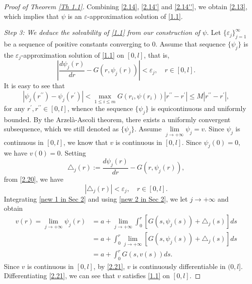 \documentclass[a4paper,11pt]{amsart}
\theoremstyle{plain}
\theoremstyle{remark}
\numberwithin{equation}{section}
\numberwithin{figure}{section}
\numberwithin{remark}{section}
\begin{document}
\begin{sloppypar}
\begin{proof}[Proof of Theorem \ref{Th 1.1}]
\vspace{2mm}
	
	Combining \eqref{2.14}, \eqref{2.14'} and \eqref{2.14''}, we obtain \eqref{2.13}, which implies that $\psi$ is an $\varepsilon$-approximation solution of \eqref{1.1}.
		
	\vspace{2mm}	
	\textit{Step 3: We deduce the solvability of \eqref{1.1} from our construction of $\psi$}.
	Let $\{\varepsilon_j\}_{j=1}^{\infty}$ be a sequence of positive constants converging to $0$. Assume that sequence $\{\psi_j\}$ is the $\varepsilon_j$-approximation solution of \eqref{1.1} on $[0,l]$, that is,
	\begin{equation}\label{2.20}
		\left| \frac{d\psi_j(r)}{dr}-G(r,\psi_j(r))\right| <\varepsilon_j, \quad r\in [0,l].
	\end{equation} 	
	It is easy to see that
	\begin{equation*}
		\left| \psi_j(r^{\prime \prime })-\psi_j(r^{\prime})\right| <\max_{1\leq i \leq m}G(r_i,\psi(r_i))|r^{\prime\prime}-r^{\prime}|\leq M|r^{\prime\prime}-r^{\prime}|,
	\end{equation*}
	for any $r^{\prime}, r^{\prime \prime } \in [0,l]$, whence
	 the sequence $\{\psi_j\}$ is equicontinuous and uniformly bounded.
	By the Arzel\` a-Ascoli theorem, there exists a uniformly convergent subsequence, which we still  denoted as $\{\psi_j\}$.
	Assume $\lim\limits_{j\to +\infty}\psi_j=v$. 
	Since $\psi_j$ is continuous in $[0, l]$, we know that $v$ is continuous in $[0, l]$.
	Since $\psi_j(0)=0$, we have $v(0)=0$. Setting
	\begin{equation}\label{new 1 in Sec 2}
		\triangle_j(r):=\frac{d\psi_j(r)}{dr}-G(r,\psi_j(r)),
	\end{equation}
	from \eqref{2.20}, we have
	\begin{equation}\label{new 2 in Sec 2}
	|\triangle_j(r)|<\varepsilon_j, \quad   r\in[0,l].
	\end{equation}
	Integrating \eqref{new 1 in Sec 2} and using \eqref{new 2 in Sec 2}, we let $j\to +\infty$ and obtain
	\begin{equation}\label{2.21}
		\begin{split}
			v(r)=\lim_{j\to +\infty}\psi_j(r)
			&=a+\lim_{j\to +\infty}\int_0^r\left[  G(s,\psi_j(s))+\triangle_j(s)\right] ds\\
			&=a+\int_0^r \lim_{j\to +\infty}\left[  G(s,\psi_j(s))+\triangle_j(s)\right] ds\\
			&=a+\int_0^r G(s,v(s))ds.
		\end{split}
	\end{equation}
	Since $v$ is continuous in $[0, l]$, by \eqref{2.21}, $v$ is continuously differentiable in $(0,l]$.
	Differentiating \eqref{2.21}, we can see that $v$ satisfies \eqref{1.1} on $[0,l]$.
	

\end{proof}
\end{sloppypar}
\end{document}
